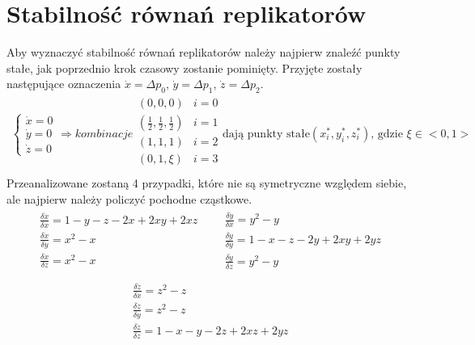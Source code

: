 \section{Stabilność równań replikatorów}
\label{sec:stab_repl}
Aby wyznaczyć stabilność równań replikatorów należy najpierw znaleźć punkty stałe, jak poprzednio krok czasowy zostanie pominięty.  Przyjęte zostały następujące oznaczenia $\dot{x} = \Delta p_0$, $\dot{y} = \Delta p_1$, $\dot{z} = \Delta p_2$.
\begin{align*}
\left\{
\begin{array}{l}
\dot{x} = 0 \\
\dot{y} = 0 \\
\dot{z} = 0 
\end{array}
\right.
\Rightarrow kombinacje
\begin{array}{ll}
(0,0,0)  & i=0 \\
(\frac{1}{2},\frac{1}{2},\frac{1}{2}) & i=1 \\
(1,1,1) & i=2 \\
(0,1,\xi) & i=3 \\ 
\end{array}
\text{dają punkty stałe} (x^*_i, y^*_i, z^*_i)\text{, gdzie }\xi \in <0,1>
\end{align*}
Przeanalizowane zostaną 4 przypadki, które nie są symetryczne względem siebie, ale najpierw należy policzyć pochodne cząstkowe.
\begin{align*}
\begin{array}{l}
\frac{\delta \dot{x}}{\delta x} = 1-y-z-2x+2xy+2xz\\
\frac{\delta \dot{x}}{\delta y} = x^2 - x\\
\frac{\delta \dot{x}}{\delta z} = x^2 - x\\
\end{array}
&&
\begin{array}{l}
\frac{\delta \dot{y}}{\delta x} = y^2 - y\\
\frac{\delta \dot{y}}{\delta y} = 1-x-z-2y+2xy+2yz\\
\frac{\delta \dot{y}}{\delta z} = y^2 - y\\
\end{array}
\end{align*}
\begin{align*}
\begin{array}{l}
\frac{\delta \dot{z}}{\delta x} = z^2 - z\\
\frac{\delta \dot{z}}{\delta y} = z^2 - z\\
\frac{\delta \dot{z}}{\delta z} = 1-x-y-2z+2xz+2yz\\
\end{array}
\end{align*}
